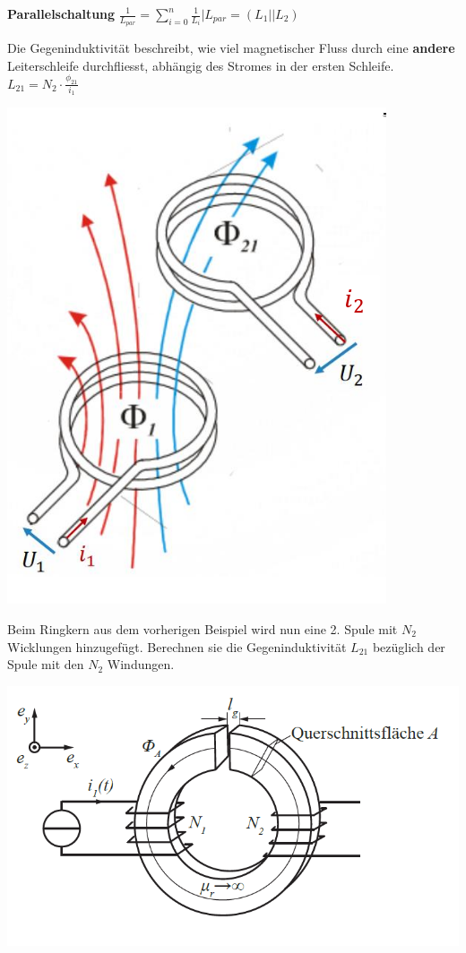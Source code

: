 		\textbf{Parallelschaltung}
		\formulaBegin
		$\displaystyle \frac{1}{L_{par}} = \sum_{i=0}^n \frac{1}{L_i} \Bigg\rvert L_{par} = (L_1 || L_2 )$
		\formulaEnd
	 \iend
\newpage


\beginip
Die Gegeninduktivität beschreibt, wie viel magnetischer Fluss durch eine \textbf{andere} Leiterschleife durchfliesst, abhängig
des Stromes in der ersten Schleife.
\formulaBegin
$\displaystyle L_{21} = N_2 \cdot \frac{\phi_{21}}{i_1}$
\formulaEnd
\begin{center}

	\includegraphics[scale=0.3]{img/gegenind}
\end{center}
\iend


\beginbsp
Beim Ringkern aus dem vorherigen Beispiel wird nun eine 2. Spule mit $N_2$ Wicklungen hinzugefügt. Berechnen sie die Gegeninduktivität $L_{21}$ bezüglich der Spule mit den $N_2$ Windungen.
\begin{center}

	\includegraphics[scale=0.5]{img/induktivitaet_bsp_2.png}
\end{center}
\iend

